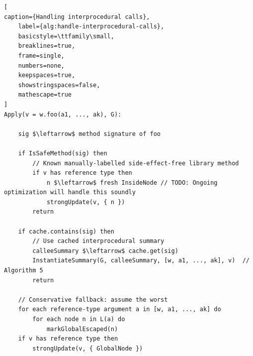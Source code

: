
\label{agl4i}
\begin{lstlisting}[
caption={Handling interprocedural calls}, 
    label={alg:handle-interprocedural-calls},
    basicstyle=\ttfamily\small,
    breaklines=true,
    frame=single,
    numbers=none,
    keepspaces=true,
    showstringspaces=false,
    mathescape=true
]
Apply(v = w.foo(a1, ..., ak), G):

    sig $\leftarrow$ method signature of foo

    if IsSafeMethod(sig) then
        // Known manually-labelled side-effect-free library method
        if v has reference type then
            n $\leftarrow$ fresh InsideNode // TODO: Ongoing optimization will handle this soundly
            strongUpdate(v, { n })
        return
   
    if cache.contains(sig) then
        // Use cached interprocedural summary
        calleeSummary $\leftarrow$ cache.get(sig)
        InstantiateSummary(G, calleeSummary, [w, a1, ..., ak], v)  // Algorithm 5
        return

    // Conservative fallback: assume the worst
    for each reference-type argument a in [w, a1, ..., ak] do
        for each node n in L(a) do
            markGlobalEscaped(n)
    if v has reference type then
        strongUpdate(v, { GlobalNode })
\end{lstlisting}


